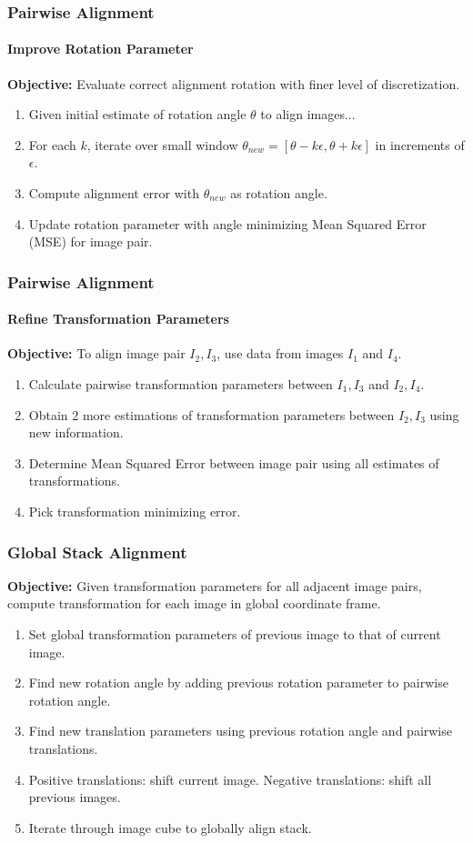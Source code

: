 \documentclass{beamer}
\begin{document}
\begin{frame}
\frametitle{Pairwise Alignment}
\framesubtitle{Improve Rotation Parameter} 
\textbf{Objective:} Evaluate correct alignment rotation with finer level of discretization. 
\begin{enumerate}
\item Given initial estimate of rotation angle $\theta$ to align images...
\item For each $k$, iterate over small window $\theta_{new} = [\theta-k\epsilon, \theta+k\epsilon]$ in increments of $\epsilon$.
\item Compute alignment error with $\theta_{new}$ as rotation angle.
\item Update rotation parameter with angle minimizing Mean Squared Error (MSE) for image pair.
\end{enumerate}
\end{frame}

\begin{frame}
\frametitle{Pairwise Alignment}
\framesubtitle{Refine Transformation Parameters}
\textbf{Objective:} To align image pair $I_2, I_3$, use data from images $I_1$ and $I_4$. \\
\begin{enumerate}
\item Calculate pairwise transformation parameters between $I_1,I_3$ and $I_2,I_4$.
\item Obtain 2 more estimations of transformation parameters between $I_2,I_3$ using new information.
\item Determine Mean Squared Error between image pair using all estimates of transformations.
\item Pick transformation minimizing error.
\end{enumerate}
\end{frame}

\begin{frame}
\frametitle{Global Stack Alignment}
\textbf{Objective:} Given transformation parameters for all adjacent image pairs, compute transformation for each image in global coordinate frame.
\begin{enumerate}
\item Set global transformation parameters of previous image to that of current image. 
\item Find new rotation angle by adding previous rotation parameter to pairwise rotation angle. 
\item Find new translation parameters using previous rotation angle and pairwise translations.
\item Positive translations: shift current image. Negative translations: shift all previous images.
\item Iterate through image cube to globally align stack. 
\end{enumerate}
\end{frame}
\end{document}
